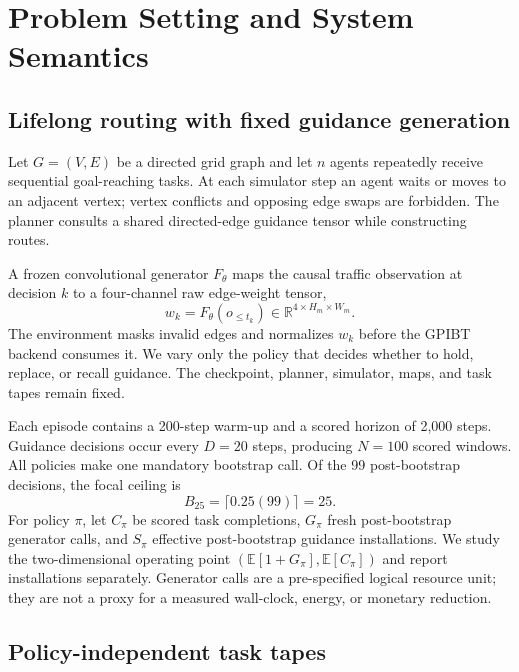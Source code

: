 \documentclass[sigconf,anonymous,review]{acmart}
\begin{document}
\section{Problem Setting and System Semantics}

\subsection{Lifelong routing with fixed guidance generation}

Let $G=(V,E)$ be a directed grid graph and let $n$ agents repeatedly receive
sequential goal-reaching tasks. At each simulator step an agent waits or moves
to an adjacent vertex; vertex conflicts and opposing edge swaps are forbidden.
The planner consults a shared directed-edge guidance tensor while constructing
routes.

A frozen convolutional generator $F_\theta$ maps the causal traffic
observation at decision $k$ to a four-channel raw edge-weight tensor,
\begin{equation}
  w_k=F_\theta(o_{\leq t_k})\in\mathbb{R}^{4\times H_m\times W_m}.
\end{equation}
The environment masks invalid edges and normalizes $w_k$ before the GPIBT
backend consumes it. We vary only the policy that decides whether to hold,
replace, or recall guidance. The checkpoint, planner, simulator, maps, and task
tapes remain fixed.

Each episode contains a 200-step warm-up and a scored horizon of 2,000 steps.
Guidance decisions occur every $D=20$ steps, producing $N=100$ scored windows.
All policies make one mandatory bootstrap call. Of the 99 post-bootstrap
decisions, the focal ceiling is
\begin{equation}
  B_{25}=\lceil0.25(99)\rceil=25.
\end{equation}
For policy $\pi$, let $C_\pi$ be scored task completions, $G_\pi$ fresh
post-bootstrap generator calls, and $S_\pi$ effective post-bootstrap guidance
installations. We study the two-dimensional operating point
$(\mathbb{E}[1+G_\pi],\mathbb{E}[C_\pi])$ and report installations separately.
Generator calls are a pre-specified logical resource unit; they are not a proxy
for a measured wall-clock, energy, or monetary reduction.

\subsection{Policy-independent task tapes}
\end{document}
